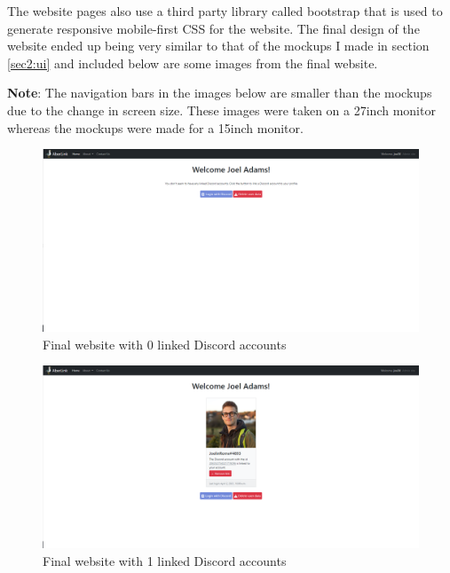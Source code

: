 The website pages also use a third party library called bootstrap \cite{bootstrap} that is used to generate responsive mobile-first CSS for the website. The final design of the website ended up being very similar to that of the mockups I made in section \ref{sec2:ui} and included below are some images from the final website.

\textbf{Note}: The navigation bars in the images below are smaller than the mockups due to the change in screen size. These images were taken on a 27inch monitor whereas the mockups were made for a 15inch monitor.

\begin{figure}[H]
	\centering
	\includegraphics[width=1\linewidth]{Figures/website-acc-0.png}
	\caption{Final website with 0 linked Discord accounts}
	\label{fig:final-web-acc-0}
\end{figure}

\begin{figure}[H]
	\centering
	\includegraphics[width=1\linewidth]{Figures/website-acc-1.png}
	\caption{Final website with 1 linked Discord accounts}
	\label{fig:final-web-acc-1}
\end{figure}

